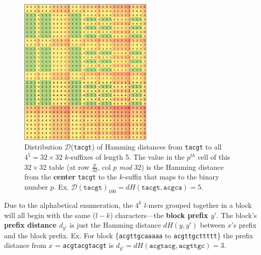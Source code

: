 \documentclass[conference]{IEEEtran}
\begin{document}
\begin{enumerate}[label={\em \arabic*.}]
			\begin{figure}[h]
				\centering
				\label{fig:distribution}
				\includegraphics[width=2.5in]{img/D(tacgt)}
				\caption{
					Distribution $\mathcal{D}$(\texttt{tacgt}) of Hamming distances from \texttt{tacgt} 
					to all $4^{5} = 32\times32$ $k$-suffixes of length 5.
					The value in the $p^{th}$ cell of this $32\times32$ table (at row $\frac{p}{32}$, col $p$ \emph{mod} 32) is the Hamming distance from the \textbf{center} \texttt{tacgt} to the $k$-suffix that maps to the binary number $p$.\newline
					Ex. $\mathcal{D}(\texttt{tacgt})_{100} = dH(\texttt{tacgt}, \texttt{acgca}) = 5$.\newline
				}
				\end{figure}\newline
			Due to the alphabetical enumeration, the $4^{k}$ $l$-mers grouped together in a block will all begin with the same ($l-k$) characters---the {\boldmath\bf block prefix $y'$}. The block's {\boldmath\bf prefix distance $d_{y'}$} is just the Hamming distance $dH(y,y')$ between $x$'s prefix and the block prefix.\newline\newline
				{\small
					Ex. For block \{\texttt{acgttgcaaaaa} to \texttt{acgttgcttttt}\}\newline
					\hspace*{18pt} the prefix distance from $x$ = \texttt{acgtacgtacgt} is\newline
					\hspace*{21pt} $d_{y'} = dH(\texttt{acgtacg}, \texttt{acgttgc}) = 3$. } \newline\newline

\end{enumerate}
\end{document}
